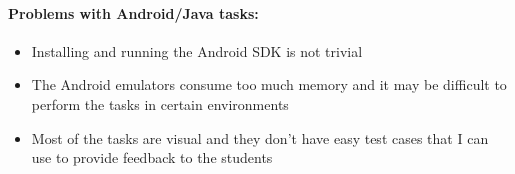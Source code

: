 \clearpage



\smallskip
\paragraph{\textbf{Problems with Android/Java tasks:}}

\begin{itemize}
    \item Installing and running the Android SDK is not trivial
    \item The Android emulators consume too much memory and it may be difficult to perform the tasks in certain environments
    \item Most of the tasks are visual and they don't have easy test cases that I can use to provide feedback to the students
\end{itemize}










